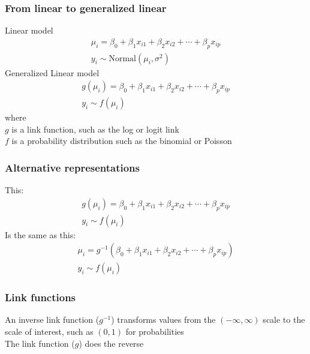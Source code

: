 \documentclass[color=usenames,dvipsnames]{beamer}\usepackage[]{graphicx}\usepackage[]{color}
\begin{document}
\begin{frame}
  \frametitle{From linear to generalized linear}
  {Linear model}
  \begin{gather*}
    \mu_i = \beta_0 + \beta_1 x_{i1} + \beta_2 x_{i2} + \cdots + \beta_p x_{ip} \\
    y_i \sim \mathrm{Normal}(\mu_i, \sigma^2)
  \end{gather*}
  \pause
  \vfill
  {Generalized Linear model}
  \begin{gather*}
    g(\mu_i) = \beta_0 + \beta_1 x_{i1} + \beta_2 x_{i2} + \cdots + \beta_p x_{ip} \\
    y_i \sim f(\mu_i)
  \end{gather*}
  \pause
  {where} \\
  $g$ is a link function, such as the log or logit link \\
  \pause
  $f$ is a probability distribution such as the binomial or Poisson
\end{frame}


\begin{frame}
  \frametitle{Alternative representations}
  {This:}
  \begin{gather*}
    g(\mu_i) = \beta_0 + \beta_1 x_{i1} + \beta_2 x_{i2} + \cdots + \beta_p x_{ip} \\
    y_i \sim f(\mu_i)
  \end{gather*}
  \pause
  {Is the same as this:}
  \begin{gather*}
    \mu_i = g^{-1}(\beta_0 + \beta_1 x_{i1} + \beta_2 x_{i2} + \cdots + \beta_p x_{ip}) \\
    y_i \sim f(\mu_i)
  \end{gather*}
\end{frame}


\begin{frame}
  \frametitle{Link functions}
  An inverse link function ($g^{-1}$) transforms values from the $(-\infty,\infty)$
  scale to the scale of interest, such as $(0,1)$ for probabilities  \\
  \pause
  \vfill
  The link function ($g$) does the reverse \\
\end{frame}
\end{document}
